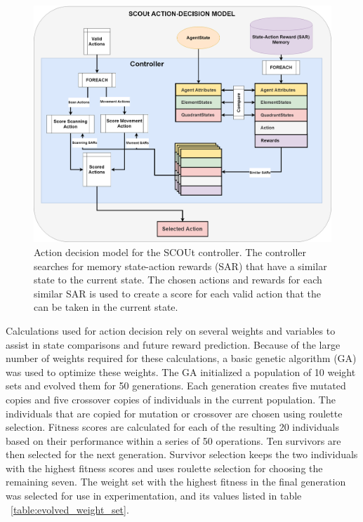 \begin{figure}[H]
  \includegraphics[width=1.0\columnwidth]{Figures/scout_decision_model.png}
  \caption{Action decision model for the SCOUt controller. The controller searches for memory state-action rewards (SAR) that have a similar state to the current state. The chosen actions and rewards for each similar SAR is used to create a score for each valid action that the can be taken in the current state.}
  \label{fig:scout_decision_model}
\end{figure}

Calculations used for action decision rely on several weights and variables to assist in state comparisons and future reward prediction.
Because of the large number of weights required for these calculations, a basic genetic algorithm (GA) was used to optimize these weights.
The GA initialized a population of 10 weight sets and evolved them for 50 generations.
Each generation creates five mutated copies and five crossover copies of individuals in the current population.
The individuals that are copied for mutation or crossover are chosen using roulette selection.
Fitness scores are calculated for each of the resulting 20 individuals based on their performance within a series of 50 operations.
Ten survivors are then selected for the next generation.
Survivor selection keeps the two individuals with the highest fitness scores and uses roulette selection for choosing the remaining seven.
The weight set with the highest fitness in the final generation was selected for use in experimentation, and its values listed in table ~\ref{table:evolved_weight_set}.

